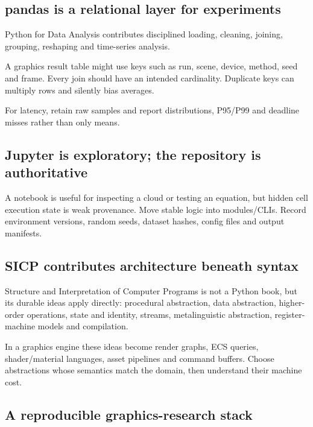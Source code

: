 \subsection{pandas is a relational layer for experiments}\label{pandas-is-a-relational-layer-for-experiments}

Python for Data Analysis contributes disciplined loading, cleaning, joining, grouping, reshaping and time-series analysis.

A graphics result table might use keys such as run, scene, device, method, seed and frame. Every join should have an intended cardinality. Duplicate keys can multiply rows and silently bias averages.

For latency, retain raw samples and report distributions, P95/P99 and deadline misses rather than only means.

\subsection{Jupyter is exploratory; the repository is authoritative}\label{jupyter-is-exploratory-the-repository-is-authoritative}

A notebook is useful for inspecting a cloud or testing an equation, but hidden cell execution state is weak provenance. Move stable logic into modules/CLIs. Record environment versions, random seeds, dataset hashes, config files and output manifests.

\subsection{SICP contributes architecture beneath syntax}\label{sicp-contributes-architecture-beneath-syntax}

Structure and Interpretation of Computer Programs is not a Python book, but its durable ideas apply directly: procedural abstraction, data abstraction, higher-order operations, state and identity, streams, metalinguistic abstraction, register-machine models and compilation.

In a graphics engine these ideas become render graphs, ECS queries, shader/material languages, asset pipelines and command buffers. Choose abstractions whose semantics match the domain, then understand their machine cost.

\subsection{A reproducible graphics-research stack}\label{a-reproducible-graphics-research-stack}

